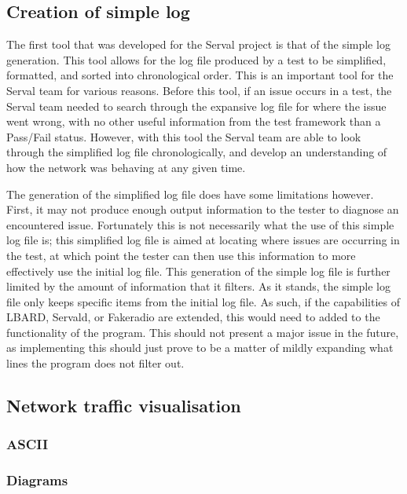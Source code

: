 \subsection{Creation of simple log}
The first tool that was developed for the Serval project is that of the simple log generation.
This tool allows for the log file produced by a test to be simplified, formatted, and sorted into chronological order.
This is an important tool for the Serval team for various reasons.
Before this tool, if an issue occurs in a test, the Serval team needed to search through the expansive log file for where the issue went wrong, with no other useful information from the test framework than a Pass/Fail status.
However, with this tool the Serval team are able to look through the simplified log file chronologically, and develop an understanding of how the network was behaving at any given time.

The generation of the simplified log file does have some limitations however.
First, it may not produce enough output information to the tester to diagnose an encountered issue.
Fortunately this is not necessarily what the use of this simple log file is; this simplified log file is aimed at locating where issues are occurring in the test, at which point the tester can then use this information to more effectively use the initial log file.
This generation of the simple log file is further limited by the amount of information that it filters.
As it stands, the simple log file only keeps specific items from the initial log file.
As such, if the capabilities of LBARD, Servald, or Fakeradio are extended, this would need to added to the functionality of the program.
This should not present a major issue in the future, as implementing this should just prove to be a matter of mildly expanding what lines the program does not filter out.

\subsection{Network traffic visualisation}

\subsubsection{ASCII}


\subsubsection{Diagrams}



